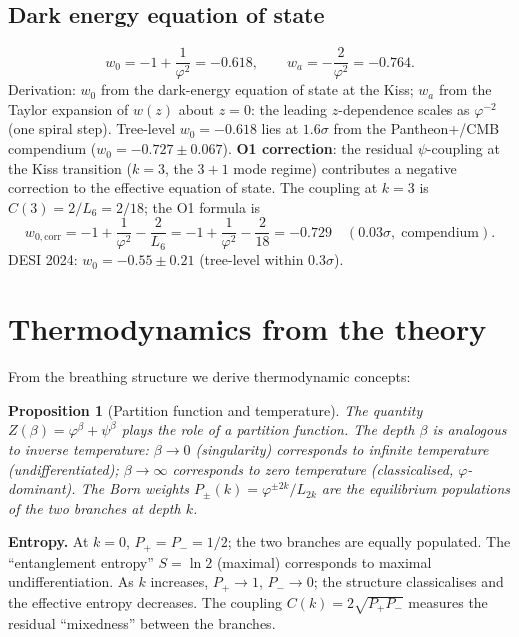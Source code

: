 \documentclass[12pt,a4paper]{article}
\newtheorem{proposition}[theorem]{Proposition}
\begin{document}
\subsection{Dark energy equation of state}
\begin{equation}
\label{eq:w0wa}
w_0 = -1 + \frac{1}{\varphi^2} = -0.618, \qquad w_a = -\frac{2}{\varphi^2} = -0.764.
\end{equation}
Derivation: $w_0$ from the dark-energy equation of state at the Kiss; $w_a$ from the Taylor expansion of $w(z)$ about $z=0$: the leading $z$-dependence scales as $\varphi^{-2}$ (one spiral step). Tree-level $w_0 = -0.618$ lies at $1.6\sigma$ from the Pantheon+/CMB compendium ($w_0 = -0.727 \pm 0.067$). \textbf{O1 correction}: the residual $\psi$-coupling at the Kiss transition ($k = 3$, the $3{+}1$ mode regime) contributes a negative correction to the effective equation of state. The coupling at $k = 3$ is $C(3) = 2/L_6 = 2/18$; the O1 formula is
\begin{equation}
w_{0,\mathrm{corr}} = -1 + \frac{1}{\varphi^2} - \frac{2}{L_6} = -1 + \frac{1}{\varphi^2} - \frac{2}{18} = -0.729 \quad (0.03\sigma,\;\text{compendium}).
\label{eq:w0-O1}
\end{equation}
DESI 2024: $w_0 = -0.55 \pm 0.21$ (tree-level within $0.3\sigma$).

\section{Thermodynamics from the theory}
\label{sec:thermodynamics}

From the breathing structure we derive thermodynamic concepts:

\begin{proposition}[Partition function and temperature]
\label{prop:thermo}
The quantity $Z(\beta) = \varphi^\beta + \psi^\beta$ plays the role of a partition function. The depth $\beta$ is analogous to inverse temperature: $\beta \to 0$ (singularity) corresponds to infinite temperature (undifferentiated); $\beta \to \infty$ corresponds to zero temperature (classicalised, $\varphi$-dominant). The Born weights $P_\pm(k) = \varphi^{\pm 2k}/L_{2k}$ are the equilibrium populations of the two branches at depth $k$.
\end{proposition}

\noindent\textbf{Entropy.} At $k = 0$, $P_+ = P_- = 1/2$; the two branches are equally populated. The ``entanglement entropy'' $S = \ln 2$ (maximal) corresponds to maximal undifferentiation. As $k$ increases, $P_+ \to 1$, $P_- \to 0$; the structure classicalises and the effective entropy decreases. The coupling $C(k) = 2\sqrt{P_+P_-}$ measures the residual ``mixedness'' between the branches.
\end{document}

